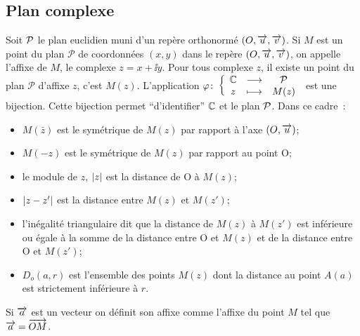 \subsection{Plan complexe}
\label{subsec:plancomplexe}
%
Soit \(\P\) le plan euclidien muni d'un repère orthonormé \((O,\vect{u}, \vect{v})\). Si \(M\) est un point du plan \(\mathcal{P}\) de coordonnées \((x,y)\) dans le repère \((O,\vect{u}, \vect{v})\), on appelle l'affixe de \(M\), le complexe \(z=x + \ii y\). Pour tous complexe \(z\), il existe un point du plan \(\mathcal{P}\) d'affixe \(z\), c'est \(M(z)\). L'application \(\fonction{\varphi}{\C}{\P}{z}{M(z)}\) est une bijection. Cette bijection permet ``d'identifier'' \(\C\) et le plan \(\P\). Dans ce cadre~:
\begin{itemize}
\item \(M(\bar{z})\) est le symétrique de \(M(z)\) par rapport à l'axe \((O,\vect{u})\);
\item \(M(-z)\) est le symétrique de \(M(z)\) par rapport au point O;
\item le module de \(z\), \(\abs{z}\) est la distance de O à \(M(z)\);
\item \(\abs{z-z'}\) est la distance entre \(M(z)\) et \(M(z')\);
\item l'inégalité triangulaire dit que la distance de \(M(z)\) à \(M(z')\) est inférieure ou égale à la somme de la distance entre O et \(M(z)\) et de la distance entre O et \(M(z')\);
\item \(D_o(a,r)\) est l'ensemble des points \(M(z)\) dont la distance au point \(A(a)\) est strictement inférieure à \(r\).
\end{itemize}
Si \(\vect{a}\) est un vecteur on définit son affixe comme l'affixe du point \(M\) tel que \(\vect{a}=\vect{OM}\).




